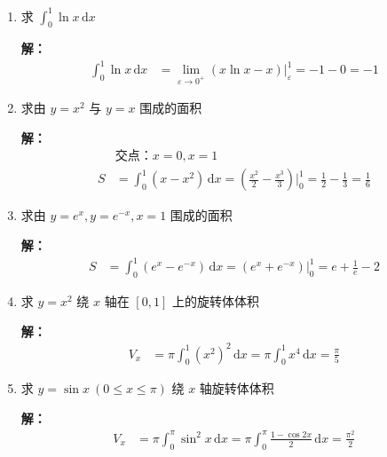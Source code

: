 \documentclass[12pt,a4paper]{article}
\newcommand{\dd}{\,\mathrm{d}}
\begin{document}
\begin{enumerate}[label=\textbf{\arabic*.}, leftmargin=*, itemsep=1.2em]
\textbf{解：}
\begin{align*}
\int_0^1 \frac{1}{\sqrt{x}}\dd x &= \lim\limits_{\varepsilon\to 0^+} 2\sqrt{x}\big|_\varepsilon^1 = 2 - 0 = 2
\end{align*}

\item 求 $\displaystyle \int_0^1 \ln x \dd x$

\textbf{解：}
\begin{align*}
\int_0^1 \ln x \dd x &= \lim\limits_{\varepsilon\to 0^+} \left(x\ln x - x\right)\big|_\varepsilon^1 = -1 - 0 = -1
\end{align*}

\item 求由 $y=x^2$ 与 $y=x$ 围成的面积

\textbf{解：}
\begin{align*}
&\text{交点：}x=0, x=1\\
S &= \int_0^1 (x-x^2)\dd x = \left(\frac{x^2}{2}-\frac{x^3}{3}\right)\big|_0^1 = \frac{1}{2}-\frac{1}{3} = \frac{1}{6}
\end{align*}

\item 求由 $y=e^x, y=e^{-x}, x=1$ 围成的面积

\textbf{解：}
\begin{align*}
S &= \int_0^1 (e^x-e^{-x})\dd x = \left(e^x+e^{-x}\right)\big|_0^1 = e+\frac{1}{e}-2
\end{align*}

\item 求 $y=x^2$ 绕 $x$ 轴在 $[0,1]$ 上的旋转体体积

\textbf{解：}
\begin{align*}
V_x &= \pi\int_0^1 (x^2)^2 \dd x = \pi\int_0^1 x^4 \dd x = \frac{\pi}{5}
\end{align*}

\item 求 $y=\sin x\ (0\le x\le\pi)$ 绕 $x$ 轴旋转体体积

\textbf{解：}
\begin{align*}
V_x &= \pi\int_0^\pi \sin^2 x \dd x = \pi\int_0^\pi \frac{1-\cos 2x}{2}\dd x = \frac{\pi^2}{2}
\end{align*}

\end{enumerate}
\end{document}
